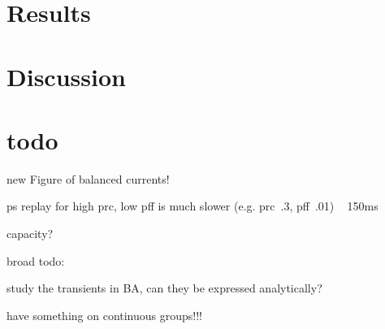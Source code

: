 \section{Results}
\section{Discussion}

\section{todo}

new Figure of balanced currents!

ps replay for high prc, low pff is much slower (e.g. prc~.3, pff~.01) ~ 150ms

capacity?

broad todo:

study the transients in BA, can they be expressed analytically?

have something on continuous groups!!!




